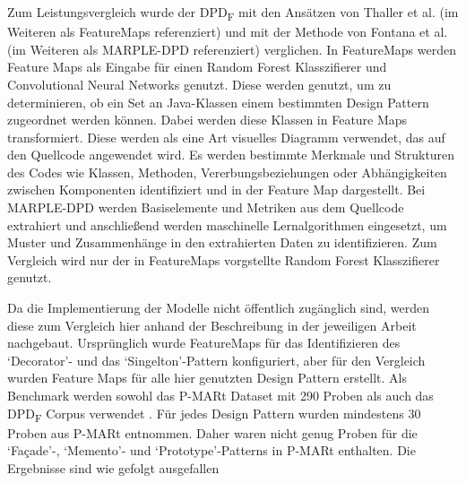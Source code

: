 \documentclass[conference]{IEEEtran}
\begin{document}
Zum Leistungsvergleich wurde der DPD\textsubscript{F} mit den Ansätzen von Thaller et al. \cite{8667978} (im Weiteren als FeatureMaps referenziert) und mit der Methode von Fontana et al. \cite{ARCELLIFONTANA20112334} (im Weiteren als MARPLE-DPD referenziert) verglichen.
In FeatureMaps werden Feature Maps als Eingabe für einen Random Forest Klasszifierer und Convolutional Neural Networks genutzt. Diese werden genutzt, um zu determinieren, ob ein Set an Java-Klassen einem bestimmten Design Pattern zugeordnet werden können.
Dabei werden diese Klassen in Feature Maps transformiert. Diese werden als eine Art visuelles Diagramm verwendet, das auf den Quellcode angewendet wird. Es werden bestimmte Merkmale und Strukturen des Codes wie Klassen, Methoden, Vererbungsbeziehungen oder Abhängigkeiten zwischen Komponenten identifiziert und in der Feature Map dargestellt.
Bei MARPLE-DPD werden Basiselemente und Metriken aus dem Quellcode extrahiert und anschließend werden maschinelle Lernalgorithmen eingesetzt, um Muster und Zusammenhänge in den extrahierten Daten zu identifizieren. Zum Vergleich wird nur der in FeatureMaps vorgstellte Random Forest Klasszifierer genutzt.

Da die Implementierung der Modelle nicht öffentlich zugänglich sind, werden diese zum Vergleich hier anhand der Beschreibung in der jeweiligen Arbeit nachgebaut. \cite[p. 10]{NAZAR2022111179}
Ursprünglich wurde FeatureMaps für das Identifizieren des `Decorator'- und das `Singelton'-Pattern konfiguriert, aber für den Vergleich wurden Feature Maps für alle hier genutzten Design Pattern erstellt.
Als Benchmark werden sowohl das P-MARt Dataset mit 290 Proben als auch das DPD\textsubscript{F} Corpus verwendet  \cite[p. 10]{NAZAR2022111179}. Für jedes Design Pattern wurden mindestens 30 Proben aus P-MARt entnommen.
Daher waren nicht genug Proben für die `Façade'-, `Memento'- und `Prototype'-Patterns in P-MARt enthalten.
Die Ergebnisse sind wie gefolgt ausgefallen  \cite[p. 11]{NAZAR2022111179}
\end{document}
